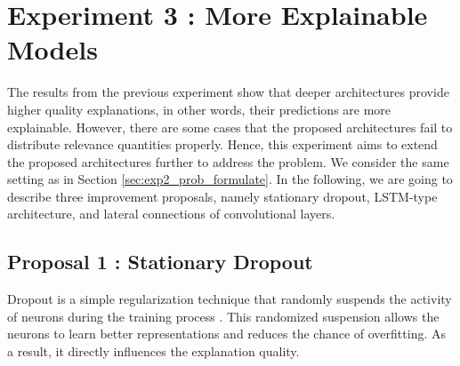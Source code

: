 \section{Experiment 3 : More Explainable Models}
The results from the previous experiment show that deeper architectures provide higher quality explanations, in other words, their predictions are more explainable. However, there are some cases that the proposed architectures fail to distribute relevance quantities properly.  Hence, this experiment aims to extend the proposed architectures further to address the problem. We consider the same setting as in Section \ref{sec:exp2_prob_formulate}. In the following, we are going to describe three improvement proposals, namely stationary dropout, LSTM-type architecture,  and lateral connections of convolutional layers.


\subsection{Proposal 1 :  Stationary Dropout}
Dropout is a simple regularization technique that randomly suspends the activity of neurons during the training process \citep{SrivastavaDropoutSimpleWay2014} . This randomized suspension allows the neurons to learn better representations and reduces the chance of overfitting.  As a result, it directly influences the explanation quality.





\begin{figure}[!htb]
\centering
{} 

\label{fig:dropout_lstm}
\end{figure}

